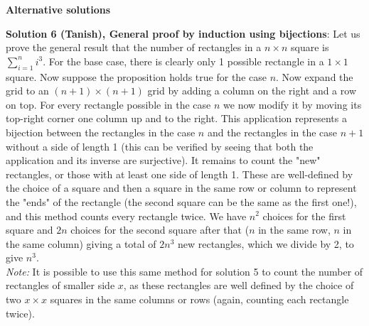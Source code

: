 {    %
    
    
}

\newpage

\textbf{Alternative solutions}

\textbf{Solution 6 (Tanish), General proof by induction using bijections}: Let us prove the general result that the number of rectangles in a $n \times n$ square is $\sum_{i=1}^n i^3$. For the base case, there is clearly only 1 possible rectangle in a $1 \times 1$ square. Now suppose the proposition holds true for the case $n$. Now expand the grid to an $(n+1)\times(n+1)$ grid by adding a column on the right and a row on top. For every rectangle possible in the case $n$ we now modify it by moving its top-right corner one column up and to the right. This application represents a bijection between the rectangles in the case $n$ and the rectangles in the case $n+1$ without a side of length 1 (this can be verified by seeing that both the application and its inverse are surjective). It remains to count the "new" rectangles, or those with at least one side of length 1. These are well-defined by the choice of a square and then a square in the same row or column to represent the "ends" of the rectangle (the second square can be the same as the first one!), and this method counts every rectangle twice. We have $n^2$ choices for the first square and $2n$ choices for the second square after that ($n$ in the same row, $n$ in the same column) giving a total of $2n^3$ new rectangles, which we divide by 2, to give $n^3$. \\
\emph{Note:} It is possible to use this same method for solution 5 to count the number of rectangles of smaller side $x$, as these rectangles are well defined by the choice of two $x \times x$ squares in the same columns or rows (again, counting each rectangle twice).